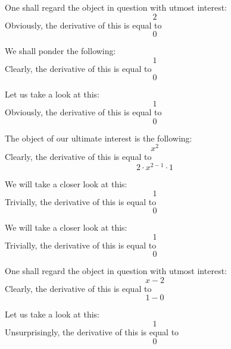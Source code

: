 \documentclass{article}
\begin{document}
One shall regard the object in question with utmost interest:
\begin{equation}
2 
\end{equation}
Obviously, the derivative of this is equal to
\begin{equation}
0 
\end{equation}

We shall ponder the following:
\begin{equation}
1 
\end{equation}
Clearly, the derivative of this is equal to
\begin{equation}
0 
\end{equation}

Let us take a look at this:
\begin{equation}
1 
\end{equation}
Obviously, the derivative of this is equal to
\begin{equation}
0 
\end{equation}

The object of our ultimate interest is the following:
\begin{equation}
x ^{2 } 
\end{equation}
Clearly, the derivative of this is equal to
\begin{equation}
2 \cdot x ^{2 - 1 } \cdot 1 
\end{equation}

We will take a closer look at this:
\begin{equation}
1 
\end{equation}
Trivially, the derivative of this is equal to
\begin{equation}
0 
\end{equation}

We will take a closer look at this:
\begin{equation}
1 
\end{equation}
Trivially, the derivative of this is equal to
\begin{equation}
0 
\end{equation}

One shall regard the object in question with utmost interest:
\begin{equation}
x - 2 
\end{equation}
Clearly, the derivative of this is equal to
\begin{equation}
1 - 0 
\end{equation}

Let us take a look at this:
\begin{equation}
1 
\end{equation}
Unsurprisingly, the derivative of this is equal to
\begin{equation}
0 
\end{equation}
\end{document}

